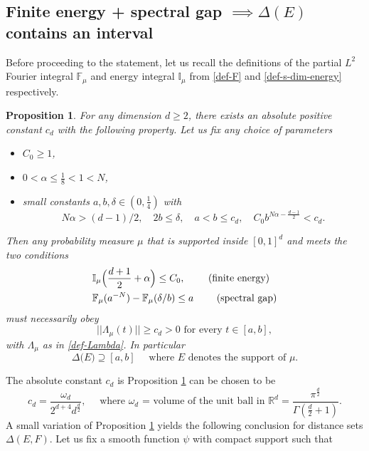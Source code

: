 \documentclass[a4paper,11pt]{amsart}
\newtheorem{prop}[thm]{\bf Proposition}
\numberwithin{equation}{section}
\begin{document}
\subsection{Finite energy + spectral gap $\implies \Delta(E)$ contains an interval} 
Before proceeding to the statement, let us recall the definitions of the partial $L^2$ Fourier integral $\mathbb F_{\mu}$ and energy integral $\mathbb I_{\mu}$ from \eqref{def-F} and \eqref{def-s-dim-energy} respectively.  
\begin{prop} \label{mainprop-1} 
For any dimension $d \geq 2$, there exists an absolute positive constant $c_d$ with the following property. 
\vskip0.1in
\noindent Let us fix any choice of parameters 
\begin{itemize} 
\item $C_0 \geq 1$, 
\item $0 < \alpha \leq \frac18 < 1 < N$,
\item small constants $a, b, \delta \in (0,\frac14)$ with   
\begin{equation}  N\alpha > (d-1)/2, \quad 2b \leq \delta, \quad a < b \leq c_d,  \quad C_0 b^{N\alpha - \frac{d-1}{2}} < c_d. \label{abdN}  \end{equation} 
\end{itemize} 
Then any probability measure $\mu$ that is supported inside $[0,1]^d$ and meets the two conditions  
\begin{align}
&\mathbb I_{\mu}\Bigl(\frac{d+1}{2} + \alpha \Bigr) \leq C_0,  \qquad \text{ (finite energy) } \label{finite-energy} \\
&\mathbb F_{\mu}(a^{-N}) - \mathbb F_{\mu}({\delta}/{b})
\leq a \qquad \text{ (spectral gap)} \label{spectral-gap}
\end{align}
must necessarily obey 
\[ ||\Lambda_{\mu}(t)|| \geq c_d > 0 \text{ for every } t \in [a, b], \]   
with $\Lambda_{\mu}$ as in \eqref{def-Lambda}. In particular 
\[ \Delta\bigl(E\bigr) \supseteq [a, b] \quad \text{ where $E$ denotes the support of $\mu$.}  \]
\end{prop}
\vskip0.1in 
 The absolute constant $c_d$ is Proposition \ref{mainprop-1} can be chosen to be 
\begin{equation}  c_d = \frac{\omega_d}{2^{d+4} d^{\frac{d}{2}}}, \quad \text{ where $\omega_d$ = volume of the unit ball in $\mathbb R^d$} = \frac{\pi^{\frac{d}{2}}}{\Gamma(\frac{d}{2}+1)}. \label{def-cd} \end{equation}  
\vskip0.1in 
\noindent A small variation of Proposition \ref{mainprop-1} yields the following conclusion for distance sets $\Delta(E, F)$. Let us fix a smooth  function $\psi$ with compact support such that  
\end{document}
